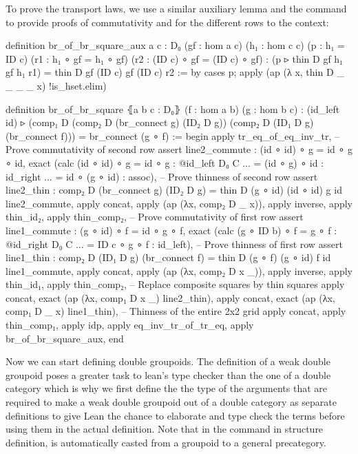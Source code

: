 To prove the transport laws, we use a similar auxiliary lemma and the
 command to provide proofs of commutativity and  for the different
rows to the context:
\begin{leancodebr}
  definition br_of_br_square_aux {a c : D₀} (gf : hom a c)
    (h₁ : hom c c) (p : h₁ = ID c)
    (r1 : h₁ ∘ gf = h₁ ∘ gf) (r2 : (ID c) ∘ gf = (ID c) ∘ gf) :
    (p ▹ thin D gf h₁ gf h₁ r1) = thin D gf (ID c) gf (ID c) r2 :=
  by cases p; apply (ap (λ x, thin D _ _ _ _ x) !is_hset.elim)

  definition br_of_br_square ⦃a b c : D₀⦄ (f : hom a b) (g : hom b c) :
    (id_left id) ▹ (comp₁ D (comp₂ D (br_connect g) (ID₂ D g))
      (comp₂ D (ID₁ D g) (br_connect f)))
    = br_connect (g ∘ f) :=
  begin
    apply tr_eq_of_eq_inv_tr,
    -- Prove commutativity of second row
    assert line2_commute : (id ∘ id) ∘ g = id ∘ g ∘ id,
      exact (calc (id ∘ id) ∘ g = id ∘ g : @id_left D₀ C
                           ... = (id ∘ g) ∘ id : id_right
                           ... = id ∘ (g ∘ id) : assoc),
    -- Prove thinness of second row
    assert line2_thin : comp₂ D (br_connect g) (ID₂ D g)
      = thin D (g ∘ id) (id ∘ id) g id line2_commute,
      apply concat, apply (ap (λx, comp₂ D _ x)), apply inverse, apply thin_id₂,
      apply thin_comp₂,
    -- Prove commutativity of first row
    assert line1_commute : (g ∘ id) ∘ f = id ∘ g ∘ f,
      exact (calc (g ∘ ID b) ∘ f = g ∘ f : @id_right D₀ C
                            ... = ID c ∘ g ∘ f : id_left),
    -- Prove thinness of first row
    assert line1_thin : comp₂ D (ID₁ D g) (br_connect f)
      = thin D (g ∘ f) (g ∘ id) f id line1_commute,
      apply concat, apply (ap (λx, comp₂ D x _)), apply inverse, apply thin_id₁,
      apply thin_comp₂,
    -- Replace composite squares by thin squares
    apply concat, exact (ap (λx, comp₁ D x _) line2_thin),
    apply concat, exact (ap (λx, comp₁ D _ x) line1_thin),
    -- Thinness of the entire 2x2 grid
    apply concat, apply thin_comp₁, apply idp,
    apply eq_inv_tr_of_tr_eq,
    apply br_of_br_square_aux,
  end
\end{leancodebr}

Now we can start defining double groupoids.
The definition of a weak double groupoid poses a greater task to lean's type
checker than the one of a double category which is why we first define the the
type of the arguments that are required to make a weak double groupoid out of a
double category as separate definitions to give Lean the chance to elaborate
and type check the terms before using them in the actual definition.
Note that in the  command in structure definition,  is
automatically casted from a groupoid to a general precategory.

